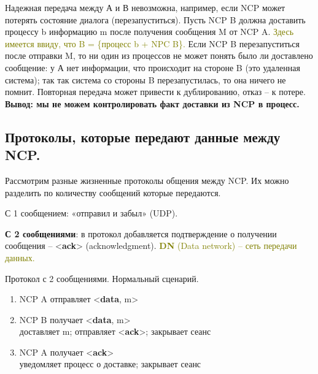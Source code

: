 Надежная передача между А и В невозможна, например, если NCP может потерять состояние диалога (перезапуститься).
Пусть NCP B должна доставить процессу b информацию m после получения сообщения M от NCP A.
\textcolor{olive}{Здесь имеется ввиду, что B = \{процесс b + NPC B\}.}
Если NCP B перезапуститься после отправки M, то ни один из процессов не может понять было ли доставлено сообщение: у А нет информации, что происходит на стороне B (это удаленная система); так так система со стороны B перезапустилась, то она ничего не помнит.
Повторная передача может привести к дублированию, отказ -- к потере.
\textbf{Вывод: мы не можем контролировать факт доставки из NCP в процесс.}

\subsection*{Протоколы, которые передают данные между NCP.}
Рассмотрим разные жизненные протоколы общения между NCP. Их можно разделить по количеству сообщений которые передаются.

С 1 сообщением: «отправил и забыл» (UDP).

\textbf{С 2 сообщениями}: в протокол добавляется подтверждение о получении сообщения -- <\textbf{ack}> (acknowledgment).
\textcolor{olive}{\textbf{DN} (Data network) -- сеть передачи данных.}

\begin{algorithm}
	\caption{Протокол с 2 сообщениями. Нормальный сценарий.}
	\begin{enumerate}
		\item NCP A отправляет <\textbf{data}, m>
		\item NCP B получает <\textbf{data}, m> \\
			доставляет m; отправляет <\textbf{ack}>; закрывает сеанс
		\item NCP A получает <\textbf{ack}> \\
			уведомляет процесс о доставке; закрывает сеанс
	\end{enumerate}
\end{algorithm}


